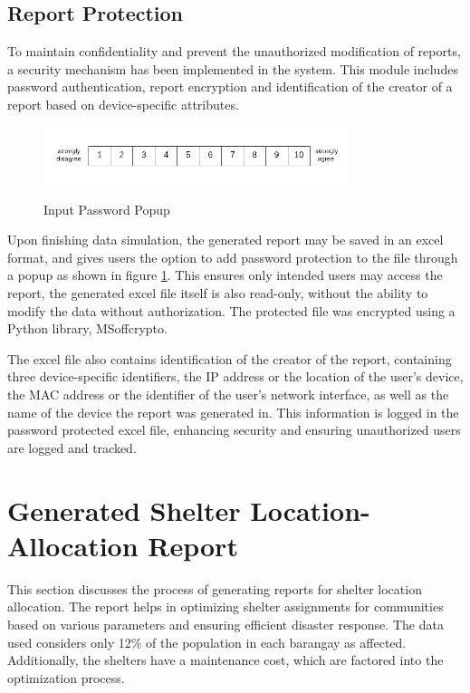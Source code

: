 \subsection{Report Protection}
	To maintain confidentiality and prevent the unauthorized modification of reports, a security mechanism has been implemented in the system. This module includes password authentication, report encryption and identification of the creator of a report based on device-specific attributes.
	
	\begin{figure}[h!]
		\caption{Input Password Popup}
		\centering
		\includegraphics[width=3.5in]{Nrs-10}
		\label{passPop}
	\end{figure}
	Upon finishing data simulation, the generated report may be saved in an excel format, and gives users the option to add password protection to the file through a popup as shown in figure \ref{passPop}. This ensures only intended users may access the report, the generated excel file itself is also read-only, without the ability to modify the data without authorization. The protected file was encrypted using a Python library, MSoffcrypto.
	
	The excel file also contains identification of the creator of the report, containing three device-specific identifiers, the IP address or the location of the user’s device, the MAC address or the identifier of the user’s network interface, as well as the name of the device the report was generated in. This information is logged in the password protected excel file, enhancing security and ensuring unauthorized users are logged and tracked. 
	
\section{Generated Shelter Location-Allocation Report}
	This section discusses the process of generating reports for shelter location allocation. The report helps in optimizing shelter assignments for communities based on various parameters and ensuring efficient disaster response. The data used considers only 12\% of the population in each barangay as affected. Additionally, the shelters have a maintenance cost, which are factored into the optimization process.
	
